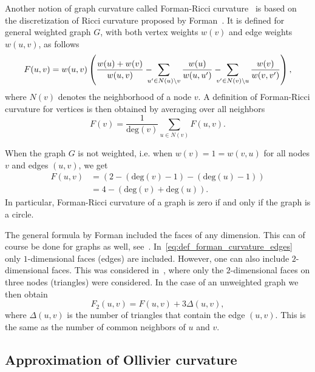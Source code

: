\documentclass{article}
\begin{document}
Another notion of graph curvature called Forman-Ricci curvature~\cite{sreejith2016forman} is based on the discretization of Ricci curvature proposed by Forman~\cite{forman2003bochner}. It is defined for general weighted graph $G$, with both vertex weights $w(v)$ and edge weights $w(u,v)$, as follows
\begin{equation}\label{eq:def_forman_curvature_edges}
	F(u,v) = w(u,v) \left(\frac{w(u) + w(v)}{w(u,v)} - \hspace{-8pt}\sum_{u^\prime \in N(u)\setminus v}  \frac{w(u)}{w(u,u^\prime)} - \hspace{-8pt} \sum_{v^\prime \in N(v) \setminus u} \frac{w(v)}{w(v,v^\prime)}\right),
\end{equation}
where $N(v)$ denotes the neighborhood of a node $v$. A definition of Forman-Ricci curvature for vertices is then obtained by averaging over all neighbors
\begin{equation}\label{eq:def_forman_curvature_nodes}
	F(v) = \frac{1}{\mathrm{deg}(v)} \sum_{u \in N(v)} F(u,v).
\end{equation}

When the graph $G$ is not weighted, i.e. when $w(v) = 1 = w(v,u)$ for all nodes $v$ and edges $(u,v)$, we get
\begin{align*}
	F(u,v) &= \left(2 - (\mathrm{deg}(v) - 1) - (\mathrm{deg}(u) - 1)\right) \\
	&= 4 - (\mathrm{deg}(v) + \mathrm{deg}(u)).
\end{align*}
In particular, Forman-Ricci curvature of a graph is zero if and only if the graph is a circle.

The general formula by Forman included the faces of any dimension. This can of course be done for graphs as well, see~\cite{weber2017coarse}. In~\eqref{eq:def_forman_curvature_edges} only $1$-dimensional faces (edges) are included. However, one can also include $2$-dimensional faces. This was considered in~\cite{samal2018comparative}, where only the $2$-dimensional faces on three nodes (triangles) were considered. In the case of an unweighted graph we then obtain
\begin{equation}\label{eq:def_forman_curvature_triangles}
	F_2(u,v) = F(u,v) + 3\Delta(u,v),
\end{equation}
where $\Delta(u,v)$ is the number of triangles that contain the edge $(u,v)$. This is the same as the number of common neighbors of $u$ and $v$. 

\subsection{Approximation of Ollivier curvature}
\end{document}
